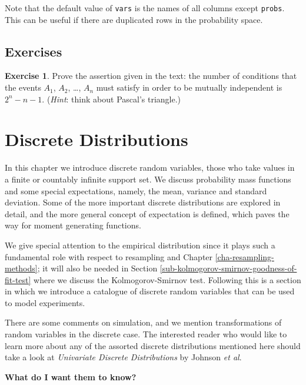 \documentclass[]{book}
\numberwithin{equation}{chapter}
\numberwithin{figure}{chapter}
\theoremstyle{plain}
\theoremstyle{definition}
\newtheorem{xca}{Exercise}[chapter]
\theoremstyle{remark}
\theoremstyle{definition}
\theoremstyle{definition}
\theoremstyle{remark}
\begin{document}
Note that the default value of \texttt{vars} is the names of all columns
except \texttt{probs}. This can be useful if there are duplicated rows
in the probability space.

\section{Exercises}\label{exercises-2}

\bigskip

\begin{xca}
Prove the assertion given in the text: the number of conditions that the
events \(A_{1}\), \(A_{2}\), \ldots{}, \(A_{n}\) must satisfy in order
to be mutually independent is \(2^{n} - n - 1\). (\emph{Hint}: think
about Pascal's triangle.)
\end{xca}

\chapter{Discrete Distributions}\label{cha-discrete-distributions}

In this chapter we introduce discrete random variables, those who take
values in a finite or countably infinite support set. We discuss
probability mass functions and some special expectations, namely, the
mean, variance and standard deviation. Some of the more important
discrete distributions are explored in detail, and the more general
concept of expectation is defined, which paves the way for moment
generating functions.

We give special attention to the empirical distribution since it plays
such a fundamental role with respect to resampling and Chapter
\ref{cha-resampling-methods}; it will also be needed in Section
\ref{sub-kolmogorov-smirnov-goodness-of-fit-test} where we discuss the
Kolmogorov-Smirnov test. Following this is a section in which we
introduce a catalogue of discrete random variables that can be used to
model experiments.

There are some comments on simulation, and we mention transformations of
random variables in the discrete case. The interested reader who would
like to learn more about any of the assorted discrete distributions
mentioned here should take a look at \emph{Univariate Discrete
Distributions} by Johnson \emph{et al}\autocite{Johnson1993}.

\textbf{What do I want them to know?}
\end{document}
